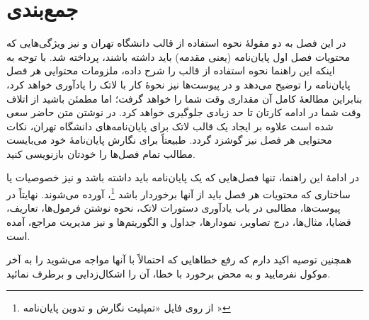 \section{جمع‌بندی}
در این فصل به دو مقولهٔ نحوه استفاده از قالب \پ دانشگاه تهران و نیز ویژگی‌هایی که محتویات فصل اول پایان‌نامه (یعنی مقدمه) باید داشته باشند، پرداخته شد. با توجه به اینکه این راهنما نحوه استفاده از قالب را شرح داده، ملزومات محتوایی هر فصل پایان‌نامه را توضیح می‌دهد و در پیوست‌ها نیز نحوهٔ کار با لاتک را یادآوری خواهد کرد، بنابراین مطالعهٔ کامل آن مقداری وقت شما را خواهد گرفت؛ اما مطمئن باشید از اتلاف وقت شما در ادامه کارتان تا حد زیادی جلوگیری خواهد کرد. در نوشتن متن حاضر سعی شده است علاوه بر ایجاد یک قالب لاتک برای پایان‌نامه‌های دانشگاه تهران، نکات محتوایی هر فصل نیز گوشزد گردد. طبیعتاً برای نگارش پایان‌نامهٔ خود می‌بایست مطالب تمام فصل‌ها را خودتان بازنویسی کنید.

در ادامهٔ این راهنما، تنها فصل‌هایی که یک پایان‌نامه باید داشته باشد و نیز خصوصیات یا ساختاری که محتویات هر فصل باید از آنها برخوردار باشد%
\footnote{از روی فایل «تمپلیت نگارش و تدوین پایان‌نامه \cite{UTThesisGuide}»}،
آورده می‌شوند. نهایتاً  در پیوست‌ها، مطالبی در باب یادآوری دستورات لاتک، نحوه نوشتن فرمول‌ها، تعاریف، قضایا، مثال‌ها، درج تصاویر، نمودارها، جداول و الگوریتم‌ها و نیز مدیریت مراجع، آمده است.

همچنین توصیه اکید دارم که رفع خطاهایی که احتمالاً با آنها مواجه می‌شوید را به آخر موکول نفرمایید و به محض برخورد با خطا، آن را اشکال‌زدایی و برطرف نمائید.